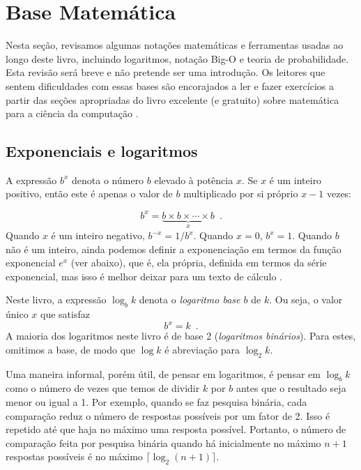 \section{Base Matemática}

Nesta seção, revisamos algumas notações matemáticas e ferramentas usadas ao
longo deste livro, incluindo logaritmos, notação Big-O e teoria de
probabilidade. Esta revisão será breve e não pretende ser uma introdução. Os
leitores que sentem dificuldades com essas bases são encorajados a ler e fazer
exercícios a partir das seções apropriadas do livro excelente (e gratuito) sobre
matemática para a ciência da computação \cite{llm11}.

\subsection{Exponenciais e logaritmos}

%
A expressão $b^x$ denota o número $b$ elevado à potência $x$. 
Se $x$ é um inteiro positivo, então este é apenas o valor de $b$ 
multiplicado por si próprio $x-1$ vezes:

\[
b^x = \underbrace{b\times b\times \cdots \times b}_{x} \enspace .
\]
Quando $x$ é um inteiro negativo, $b^{-x}=1/b^{x}$. Quando  $x=0$, $b^x=1$. 
Quando $b$ não é um inteiro, ainda podemos definir a exponenciação em termos 
da função exponencial $e^x$ (ver abaixo), que é, ela própria, definida em 
termos da série exponencial, mas isso é melhor deixar para um texto de cálculo .

%
Neste livro, a expressão $\log_b k $ denota o \emph{logaritmo base $b$} 
de $k$. Ou seja, o valor único $x$ que satisfaz
\[
b^{x} = k  \enspace .
\]
A maioria dos logaritmos neste livro é de base 2 (\emph{logaritmos binários}).
%
%
Para estes, omitimos a base, de modo que $\log k$ é abreviação para $\log_2 k$.

Uma maneira informal, porém útil, de pensar em logaritmos, é pensar 
em $\log_b k$ como o número de vezes que temos de dividir $k$ por $b$ 
antes que o resultado seja menor ou igual a 1. Por exemplo, 
quando se faz pesquisa binária, cada comparação reduz o número 
de respostas possíveis por um fator de 2. Isso é repetido até que haja no máximo
uma resposta possível. Portanto, o número de comparação feita por pesquisa
binária quando há inicialmente no máximo $n+1$ respostas possíveis é no máximo
$\lceil\log_2(n+1)\rceil$.

